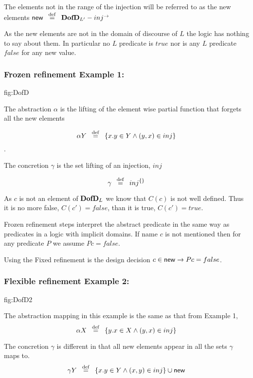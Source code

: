 
  The elements not in the range of the injection will be referred to as the {\sf new} elements ${\sf new}  \hspace*{0.5em} \stackrel{\mathrm{def}}{=} \hspace*{0.5em} {\bf DofD }_{L'} - inj^{\rightarrow}$

As the {\sf new} elements are not in the domain of discourse of $L$ the logic has nothing to say about them. In particular no $L$ predicate is  $true$ nor is any $L$ predicate $false$ for any {\sf new} value.

\subsubsection{Frozen refinement Example 1:} 
 

 {fig:DofD}


The abstraction $\alpha$ is the lifting of the element wise partial function that forgets all the {\sf new} elements  

\[\alpha Y  \hspace*{0.5em} \stackrel{\mathrm{def}}{=} \hspace*{0.5em} \{x. y\in Y \wedge (y,x)\in inj\}\].  


The concretion $\gamma$ is the set lifting of an injection, $inj$ 

\[\gamma  \hspace*{0.5em} \stackrel{\mathrm{def}}{=} \hspace*{0.5em} inj^{\{\}}\]





As $c$ is not an element of ${\bf DofD }_L$  we know that  $C(c)$ is not well defined.  Thus it  is no more false,  $C(c') = false$, than it is true, $C(c') = true$. 




Frozen refinement steps interpret the abstract predicate in the same way as predicates in a logic with implicit domains. If name $c$ is not mentioned then for any predicate $P$ we assume $P c = false$.

Using the Fixed refinement  is the  design decision $c\in {\sf new} \rightarrow P c = false$.

 
\subsubsection{Flexible refinement Example 2:} 
 {fig:DofD2}


The abstraction mapping in this example is the same as that from Example 1, 
\[\alpha X  \hspace*{0.5em} \stackrel{\mathrm{def}}{=} \hspace*{0.5em} \{y. x\in X \wedge (y,x)\in inj\}\]

The concretion $\gamma$ is different in that all {\sf new} elements appear in all the sets $\gamma$ maps to.
\[\gamma Y  \hspace*{0.5em} \stackrel{\mathrm{def}}{=} \hspace*{0.5em} \{x. y\in Y\wedge  (x,y)\in inj \}\cup {\sf new}\]


